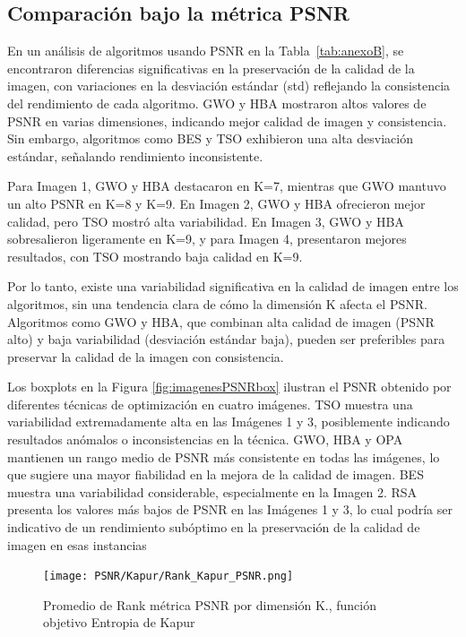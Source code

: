 \documentclass[conference]{IEEEtran}
\begin{document}
\subsection{Comparación bajo la métrica PSNR}
\noindent En un análisis de algoritmos usando PSNR en la Tabla~\ref{tab:anexoB}, se encontraron diferencias significativas en la preservación de la calidad de la imagen, con variaciones en la desviación estándar (std) reflejando la consistencia del rendimiento de cada algoritmo. GWO y HBA mostraron altos valores de PSNR en varias dimensiones, indicando mejor calidad de imagen y consistencia. Sin embargo, algoritmos como BES y TSO exhibieron una alta desviación estándar, señalando rendimiento inconsistente.

\noindent Para Imagen 1, GWO y HBA destacaron en K=7, mientras que GWO mantuvo un alto PSNR en K=8 y K=9. En Imagen 2, GWO y HBA ofrecieron mejor calidad, pero TSO mostró alta variabilidad. En Imagen 3, GWO y HBA sobresalieron ligeramente en K=9, y para Imagen 4, presentaron mejores resultados, con TSO mostrando baja calidad en K=9.

\noindent Por lo tanto, existe una variabilidad significativa en la calidad de imagen entre los algoritmos, sin una tendencia clara de cómo la dimensión K afecta el PSNR. Algoritmos como GWO y HBA, que combinan alta calidad de imagen (PSNR alto) y baja variabilidad (desviación estándar baja), pueden ser preferibles para preservar la calidad de la imagen con consistencia.

\noindent Los boxplots en la Figura \ref{fig:imagenesPSNRbox} ilustran el PSNR obtenido por diferentes técnicas de optimización en cuatro imágenes. TSO muestra una variabilidad extremadamente alta en las Imágenes 1 y 3, posiblemente indicando resultados anómalos o inconsistencias en la técnica. GWO, HBA y OPA mantienen un rango medio de PSNR más consistente en todas las imágenes, lo que sugiere una mayor fiabilidad en la mejora de la calidad de imagen. BES muestra una variabilidad considerable, especialmente en la Imagen 2. RSA presenta los valores más bajos de PSNR en las Imágenes 1 y 3, lo cual podría ser indicativo de un rendimiento subóptimo en la preservación de la calidad de imagen en esas instancias

\begin{figure}[htbp]
	\centering
	\texttt{[image: PSNR/Kapur/Rank\_Kapur\_PSNR.png]}
	\caption{Promedio de Rank métrica PSNR por dimensión K., función objetivo Entropia de Kapur}
	\label{fig:fig511}
\end{figure}
\end{document}
